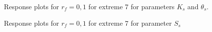 \documentclass[review,times,3p,10pt]{elsarticle}
\begin{document}
\begin{figure}[htb!]
\label{ext6rf0-Kt2}
\caption{Response plots for $r_f=0,1$ for extreme 7 for parameters $K_s$ and $\theta_s$. }
\end{figure}

\begin{figure}[htb!]
\label{ext6rf0-Ss2}
\caption{Response plots for $r_f=0,1$ for extreme 7 for parameter $S_s$}
\end{figure}
\end{document}
